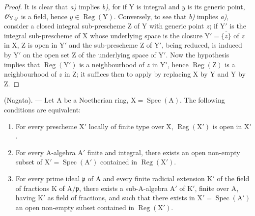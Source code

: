 \begin{proof}
It is clear that \emph{a)} implies \emph{b)}, for if $\mathrm{Y}$ is integral and $y$ is its generic point, $\mathscr{O}_{\mathrm{Y},y}$ is a field, hence
$y\in\operatorname{Reg}(\mathrm{Y})$. Conversely, to see that \emph{b)} implies \emph{a)}, consider
a closed integral sub-prescheme $\mathrm{Z}$ of $\mathrm{Y}$ with generic point $z$; if $\mathrm{Y}'$ is the
integral sub-prescheme of $\mathrm{X}$ whose underlying space is the closure $\mathrm{Y}'=\overline{\{z\}}$ of $z$
in $\mathrm{X}$, $\mathrm{Z}$ is open in $\mathrm{Y}'$ and the sub-prescheme $\mathrm{Z}$ of $\mathrm{Y}'$, being reduced, is induced by $\mathrm{Y}'$
on the open set $\mathrm{Z}$ of the underlying space of $\mathrm{Y}'$. Now the hypothesis implies that $\operatorname{Reg}(\mathrm{Y}')$ is
a neighbourhood of $z$ in $\mathrm{Y}'$, hence $\operatorname{Reg}(\mathrm{Z})$ is a neighbourhood of $z$ in $\mathrm{Z}$; it suffices then
to apply  by replacing $\mathrm{X}$ by $\mathrm{Y}$ and $\mathrm{Y}$ by $\mathrm{Z}$.
\end{proof}

\begin{theorem}[6.12.4]
\label{IV.6.12.4}
\textnormal{(Nagata).} --- Let $\mathrm{A}$ be a Noetherian ring, $\mathrm{X}=\operatorname{Spec}(\mathrm{A})$. The
following conditions are equivalent:
\begin{enumerate}[label=\emph{\alph*)}]
  \item For every prescheme $\mathrm{X}'$ locally of finite type over $\mathrm{X}$, $\operatorname{Reg}(\mathrm{X}')$ is open in $\mathrm{X}'$.
  \item For every $\mathrm{A}$-algebra $\mathrm{A}'$ finite and integral, there exists an open non-empty subset of
$\mathrm{X}'=\operatorname{Spec}(\mathrm{A}')$ contained in $\operatorname{Reg}(\mathrm{X}')$.
  \item For every prime ideal $\mathfrak{p}$ of $\mathrm{A}$ and every finite radicial extension $\mathrm{K}'$ of the field of fractions $\mathrm{K}$
of $\mathrm{A}/\mathfrak{p}$, there exists a sub-$\mathrm{A}$-algebra $\mathrm{A}'$ of $\mathrm{K}'$, finite over $\mathrm{A}$, having $\mathrm{K}'$ as field of fractions, and
such that there exists in $\mathrm{X}'=\operatorname{Spec}(\mathrm{A}')$ an open non-empty subset contained in $\operatorname{Reg}(\mathrm{X}')$.
\end{enumerate}
\end{theorem}

